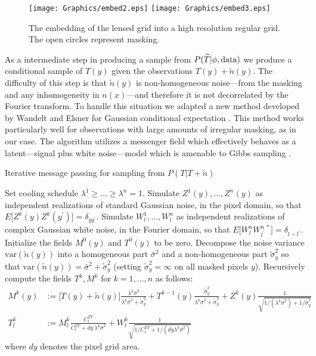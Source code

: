 \documentclass[noinfoline]{imsart}
\begin{document}
\begin{figure}[H]
{\texttt{[image: Graphics/embed2.eps]}}%
{\texttt{[image: Graphics/embed3.eps]}}
\caption{The embedding of the lensed grid into a high resolution regular grid. The open circles represent masking.}
\label{embed}
\end{figure}


As a intermediate step in producing a sample from  $P(\widetilde T |  \phi,\text{\rm data})$ we produce a conditional  sample of $T(y)$ given the observations $T(y) + \tilde n(y)$. The difficulty of this step is that $\tilde n(y)$ is non-homogeneous noise---from the masking and any inhomogeneity in $n(x)$---and therefore it is not decorrelated by the Fourier transform. To handle this situation we adapted a new method developed by Wandelt and Elsner for Gaussian conditional expectation \cite{elsner2013efficient}. This method works particularly well for observations with large amounts of irregular masking, as in our case. The algorithm utilizes a messenger field which effectively behaves as a latent---signal plus white noise---model which is amenable to Gibbs sampling \cite{jasche2014matrix}.



\begin{algorithm}[H]
\small
\caption{Iterative message passing for sampling from $P(T | T + \tilde n)$}
\label{IMP}
\begin{algorithmic}[1]
\State Set cooling schedule $\lambda^1\geq  \ldots \geq \lambda^n = 1$. 
\State Simulate $Z^{1}(y), \ldots, Z^{n}(y)$ as independent realizations of standard Gaussian noise, in the pixel domain, so that $E \bigl[ Z^{k}(y)Z^{k}(y^\prime)\bigr] = \delta_{yy^\prime}$.
\State Simulate $W^{1}_l, \ldots, W^{n}_l$ as independent realizations of complex Gaussian white noise, in the Fourier domain, so that $E\bigl[ W^{n}_l W^{n\,*}_{l^\prime}\bigr] = \delta_{l - l^\prime}$.
\State Initialize the fields $M^0(y)$ and $T^0(y)$  to be zero.
\State Decompose the noise variance $\text{var}(\tilde n(y))$ into a homogeneous part $\bar\sigma^2$ and a non-homogeneous part $\tilde\sigma_y^{2}$ so that $\text{var}(\tilde n(y)) = \bar\sigma^2 + \tilde\sigma_y^{2}$ (setting $\tilde \sigma_y^2 = \infty$ on all masked pixels $y$).
\State Recursively compute the fields $T^k, M^k$ for $k=1, \ldots, n$ as follows:
\begin{align}
M^{k}(y) &:= \bigl[T(y) + \tilde n(y) \bigr]\frac{\lambda^{k}\bar\sigma^{2}}{\lambda^{k} \bar\sigma^2 + \tilde \sigma_y^2} + T^{k-1}(y)\frac{\tilde\sigma_y^{2}}{\lambda^k\bar\sigma^2 + \tilde \sigma_y^2}  + Z^{k}(y) \frac{1}{\sqrt{1/(\lambda^k\bar\sigma^{2}) + 1/\tilde\sigma_y^{2}}} \\
T^{k}_l &:= M_l^{k}\frac{C^{TT}_l}{C^{TT}_l + dy \, \lambda^k\bar\sigma^2} + W^{k}_l
\frac{1}{\sqrt{1/C^{TT}_l + 1/(dy \lambda^k\bar\sigma^2)}} 
\end{align}
where  $dy$ denotes the pixel grid area. 
\end{algorithmic}
\end{algorithm}
\end{document}
